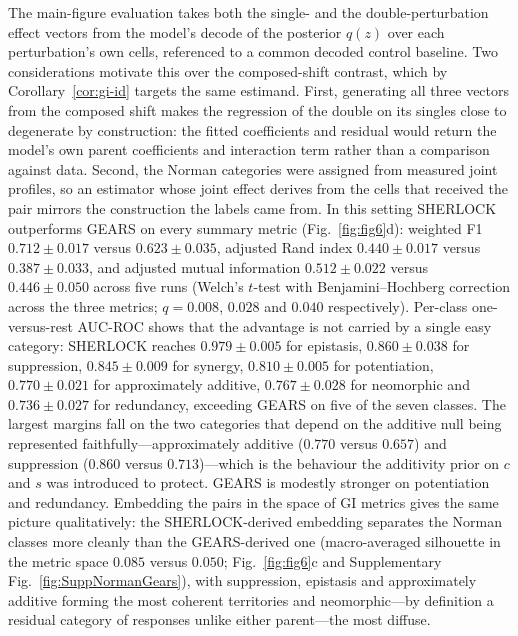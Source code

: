 The main-figure evaluation takes both the single- and the double-perturbation effect vectors from
the model's decode of the posterior $q(z)$ over each perturbation's own cells, referenced to a common
decoded control baseline. Two considerations motivate this over the composed-shift contrast, which by
Corollary~\ref{cor:gi-id} targets the same estimand. First, generating all three vectors from the
composed shift makes the regression of the double on its singles close to degenerate by construction:
the fitted coefficients and residual would return the model's own parent coefficients and interaction
term rather than a comparison against data. Second, the Norman categories were assigned from measured
joint profiles, so an estimator whose joint effect derives from the cells that received the pair
mirrors the construction the labels came from.
In this setting SHERLOCK outperforms GEARS on every summary metric (Fig.~\ref{fig:fig6}d): weighted
F1 $0.712\pm0.017$ versus $0.623\pm0.035$, adjusted Rand index $0.440\pm0.017$ versus $0.387\pm0.033$,
and adjusted mutual information $0.512\pm0.022$ versus $0.446\pm0.050$ across five runs (Welch's
$t$-test with Benjamini--Hochberg correction across the three metrics; $q=0.008$, $0.028$ and $0.040$
respectively). Per-class one-versus-rest AUC-ROC shows that the advantage is not carried by a single
easy category: SHERLOCK reaches $0.979\pm0.005$ for epistasis, $0.860\pm0.038$ for suppression,
$0.845\pm0.009$ for synergy, $0.810\pm0.005$ for potentiation, $0.770\pm0.021$ for approximately
additive, $0.767\pm0.028$ for neomorphic and $0.736\pm0.027$ for redundancy, exceeding GEARS on five
of the seven classes. The largest margins fall on the two categories that depend on the additive null
being represented faithfully---approximately additive ($0.770$ versus $0.657$) and suppression
($0.860$ versus $0.713$)---which is the behaviour the additivity prior on $c$ and $s$ was introduced
to protect. GEARS is modestly stronger on potentiation and redundancy. Embedding the pairs in the
space of GI metrics gives the same picture qualitatively: the SHERLOCK-derived embedding separates
the Norman classes more cleanly than the GEARS-derived one (macro-averaged silhouette in the metric
space $0.085$ versus $0.050$; Fig.~\ref{fig:fig6}c and Supplementary
Fig.~\ref{fig:SuppNormanGears}), with suppression, epistasis and approximately additive forming the
most coherent territories and neomorphic---by definition a residual category of responses unlike
either parent---the most diffuse.

